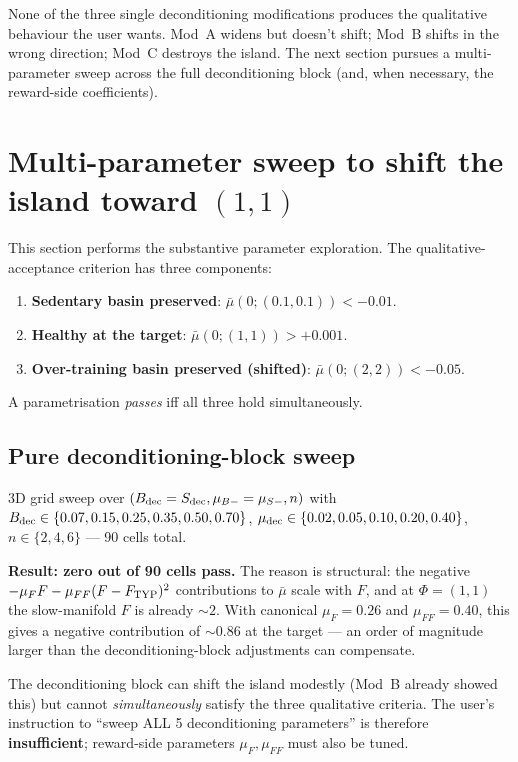 \documentclass[11pt,a4paper]{article}
\theoremstyle{definition}
\begin{document}
None of the three single deconditioning modifications produces the qualitative behaviour the user wants. Mod~A widens but doesn't shift; Mod~B shifts in the wrong direction; Mod~C destroys the island. The next section pursues a multi-parameter sweep across the full deconditioning block (and, when necessary, the reward-side coefficients).

\section{Multi-parameter sweep to shift the island toward $(1, 1)$} \label{sec:5param-sweep}

This section performs the substantive parameter exploration. The qualitative-acceptance criterion has three components:
\begin{enumerate}
  \item \textbf{Sedentary basin preserved}: $\bar\mu(0; (0.1, 0.1)) < -0.01$.
  \item \textbf{Healthy at the target}: $\bar\mu(0; (1, 1)) > +0.001$.
  \item \textbf{Over-training basin preserved (shifted)}: $\bar\mu(0; (2, 2)) < -0.05$.
\end{enumerate}
A parametrisation \emph{passes} iff all three hold simultaneously.

\subsection{Pure deconditioning-block sweep}

3D grid sweep over $(B_{\rm dec} = S_{\rm dec}, \mu_{B-} = \mu_{S-}, n)$ with $B_{\rm dec} \in \{0.07, 0.15, 0.25, 0.35, 0.50, 0.70\}$, $\mu_{\rm dec} \in \{0.02, 0.05, 0.10, 0.20, 0.40\}$, $n \in \{2, 4, 6\}$ — 90 cells total.

\textbf{Result: zero out of 90 cells pass.} The reason is structural: the negative $-\mu_F F - \mu_{FF}(F - F_{\rm TYP})^2$ contributions to $\bar\mu$ scale with $F$, and at $\Phi = (1, 1)$ the slow-manifold $F$ is already $\sim 2$. With canonical $\mu_F = 0.26$ and $\mu_{FF} = 0.40$, this gives a negative contribution of $\sim 0.86$ at the target — an order of magnitude larger than the deconditioning-block adjustments can compensate.

The deconditioning block can shift the island modestly (Mod~B already showed this) but cannot \emph{simultaneously} satisfy the three qualitative criteria. The user's instruction to ``sweep ALL 5 deconditioning parameters'' is therefore \textbf{insufficient}; reward-side parameters $\mu_F, \mu_{FF}$ must also be tuned.
\end{document}
